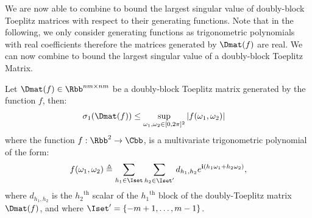 We are now able to combine  to bound the largest singular value of doubly-block Toeplitz matrices with respect to their generating functions. 
Note that in the following, we only consider generating functions as trigonometric polynomials with real coefficients therefore the matrices generated by $\Dmat(f)$ are real. We can now combine  to bound the largest singular value of a doubly-block Toeplitz Matrix. 

\begin{maintheorem} \label{theorem:doubly_block_teoplitz_sup_singular}
  Let $\Dmat(f) \in \Rbb^{nm \times nm}$ be a doubly-block Toeplitz matrix generated by the function $f$, then:
  \begin{align}
    \sigma_{1} \left( \Dmat(f) \right) &\leq \sup_{\omega_1, \omega_2 \in [0, 2\pi]^2}|f(\omega_1,\omega_2)|
  \end{align}
  where the function $f: \Rbb^2 \rightarrow \Cbb$, is a multivariate trigonometric polynomial of the form:
  \begin{equation}\label{equation:muli_variate_poly_on_M}
      f(\omega_1, \omega_2) \triangleq \sum_{h_1 \in \Iset} \sum_{h_2 \in \Iset'} d_{h_1, h_2} e^{\ci (h_1 \omega_1 + h_2 \omega_2)},
  \end{equation}
  where $d_{h_{1},h_{2}}$ is the ${h_2}^\textrm{th}$ scalar of the ${h_1}^\textrm{th}$ block of the doubly-Toeplitz matrix $\Dmat(f)$, and where $\Iset' = \{-m+1, \dots, m-1\}$.
\end{maintheorem}


